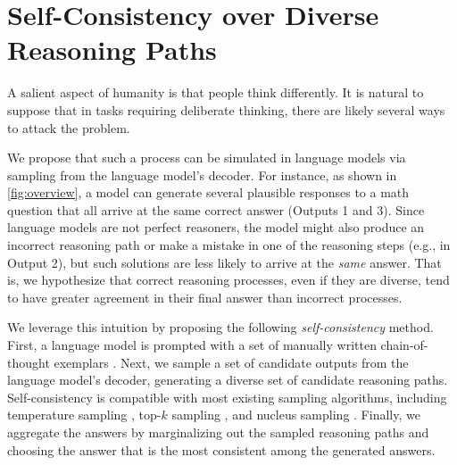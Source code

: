 \section{Self-Consistency over Diverse Reasoning Paths}

A salient aspect of humanity is that people think differently. It is natural to suppose that in tasks requiring deliberate thinking, there are likely several ways to attack the problem.

We propose that such a process can be simulated in language models via sampling from the language model's decoder. For instance, as shown in \ref{fig:overview}, a model can generate several plausible responses to a math question that all arrive at the same correct answer (Outputs 1 and 3). Since language models are not perfect reasoners, the model might also produce an incorrect reasoning path or make a mistake in one of the reasoning steps (e.g., in Output 2), but such solutions are less likely to arrive at the \textit{same} answer. That is, we hypothesize that correct reasoning processes, even if they are diverse, tend to have greater agreement in their final answer than incorrect processes.

We leverage this intuition by proposing the following \textit{self-consistency} method. First, a language model is prompted with a set of manually written chain-of-thought exemplars \citep{wei2022chain}. Next, we sample a set of candidate outputs from the language model's decoder,  generating a diverse set of candidate reasoning paths. Self-consistency is compatible with most existing sampling algorithms, including temperature sampling \citep{ACKLEY1985147,ficler-goldberg-2017-controlling}, top-$k$ sampling \citep{fan-etal-2018-hierarchical,holtzman-etal-2018-learning,Radford2019LanguageMA}, and nucleus sampling \citep{nucleus_sampling}. Finally, we aggregate the answers by marginalizing out the sampled reasoning paths and choosing the answer that is the most consistent among the generated answers.

